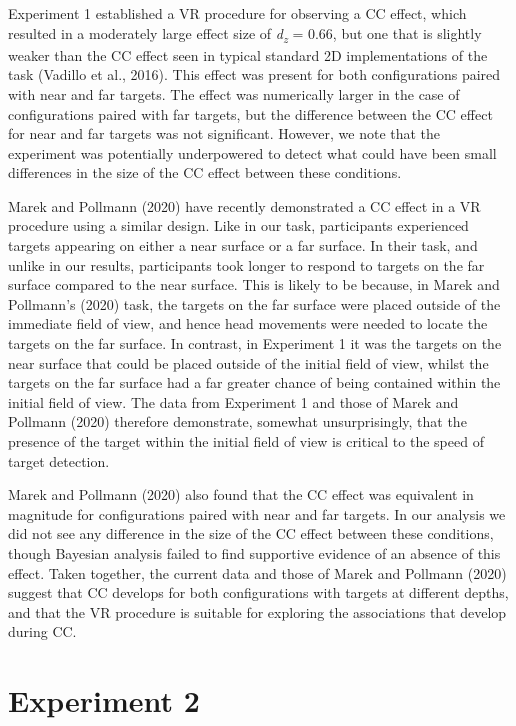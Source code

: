 \documentclass[
  man,floatsintext]{apa7}
\begin{document}
Experiment 1 established a VR procedure for observing a CC effect, which resulted in a moderately large effect size of \emph{d\textsubscript{z}} = 0.66, but one that is slightly weaker than the CC effect seen in typical standard 2D implementations of the task (Vadillo et al., 2016). This effect was present for both configurations paired with near and far targets. The effect was numerically larger in the case of configurations paired with far targets, but the difference between the CC effect for near and far targets was not significant. However, we note that the experiment was potentially underpowered to detect what could have been small differences in the size of the CC effect between these conditions.

Marek and Pollmann (2020) have recently demonstrated a CC effect in a VR procedure using a similar design. Like in our task, participants experienced targets appearing on either a near surface or a far surface. In their task, and unlike in our results, participants took longer to respond to targets on the far surface compared to the near surface. This is likely to be because, in Marek and Pollmann's (2020) task, the targets on the far surface were placed outside of the immediate field of view, and hence head movements were needed to locate the targets on the far surface. In contrast, in Experiment 1 it was the targets on the near surface that could be placed outside of the initial field of view, whilst the targets on the far surface had a far greater chance of being contained within the initial field of view. The data from Experiment 1 and those of Marek and Pollmann (2020) therefore demonstrate, somewhat unsurprisingly, that the presence of the target within the initial field of view is critical to the speed of target detection.

Marek and Pollmann (2020) also found that the CC effect was equivalent in magnitude for configurations paired with near and far targets. In our analysis we did not see any difference in the size of the CC effect between these conditions, though Bayesian analysis failed to find supportive evidence of an absence of this effect. Taken together, the current data and those of Marek and Pollmann (2020) suggest that CC develops for both configurations with targets at different depths, and that the VR procedure is suitable for exploring the associations that develop during CC.

\hypertarget{experiment-2}{%
\section{Experiment 2}\label{experiment-2}}
\end{document}
